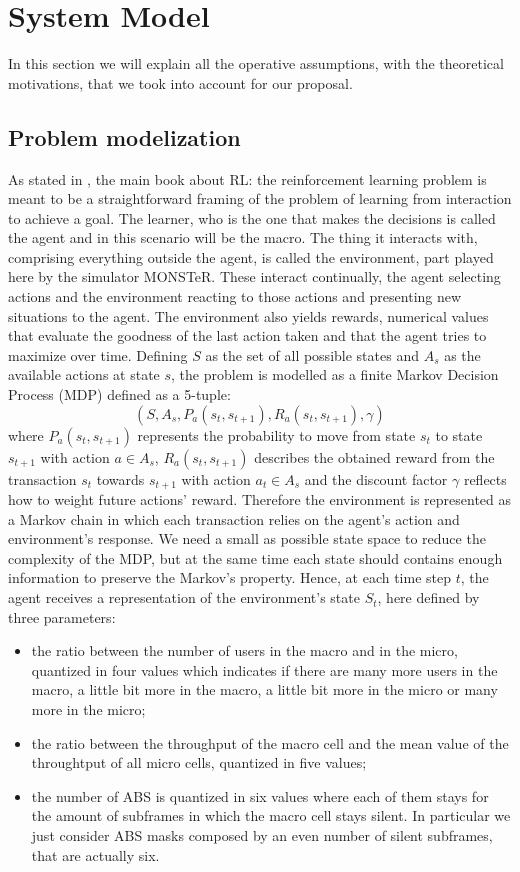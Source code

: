 \documentclass[conference,10pt]{IEEEtran}
\begin{document}
\section{System Model}\label{sec:symo}
In this section we will explain all the operative assumptions, with the theoretical motivations, that we took into account for our proposal.
\subsection{Problem modelization}
As stated in \cite{sutton1998reinforcement}, the main book about RL: the reinforcement learning problem is meant to be a straightforward framing of the problem of learning from interaction to achieve a goal. The learner, who is the one that makes the decisions is called the agent and in this scenario will be the macro. The thing it interacts with, comprising everything outside the agent, is called the environment, part played here by the simulator MONSTeR. These interact continually, the agent selecting actions and the environment reacting to those actions and presenting new situations to the agent. The environment also yields rewards, numerical values that evaluate the goodness of the last action taken and that the agent tries to maximize over time. Defining $S$ as the set of all possible states and $A_s$ as the available actions at state $s$, the problem is modelled as a finite Markov Decision Process (MDP) defined as a 5-tuple:
\begin{equation*}
(S, A_s, P_a(s_t, s_{t+1}), R_a(s_t, s_{t+1}), \gamma)
\end{equation*}
where $P_a(s_t, s_{t+1})$ represents the probability to move from state $s_t$ to state $s_{t+1}$ with action $a \in A_s$, $R_a(s_t, s_{t+1})$ describes the obtained reward from the transaction $s_t$ towards $s_{t+1}$ with action $a_t \in A_s$ and the discount factor $\gamma$ reflects how to weight future actions' reward. Therefore the environment is represented as a Markov chain in which each transaction relies on the agent's action and environment's response. We need a small as possible state space to reduce the complexity of the MDP, but at the same time each state should contains
enough information to preserve the Markov's property. Hence, at each time step $t$, the agent receives a representation of the environment's state $S_t$, here defined by three parameters:
\begin{itemize}
\item the ratio between the number of users in the macro and in the micro, quantized in four values which indicates if there are many more users in the macro, a little bit more in the macro, a little bit more in the micro or many more in the micro;
\item the ratio between the throughput of the macro cell and the mean value of the throughtput of all micro cells, quantized in five values;
\item the number of ABS is quantized in six values where each of them stays for the amount of subframes in which the macro cell stays silent. In particular we just consider ABS masks composed by an even number of silent subframes, that are actually six.
\end{itemize}
\end{document}
